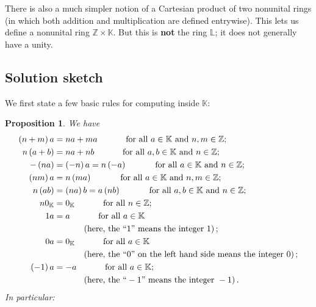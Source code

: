 \documentclass[paper=a4, fontsize=12pt]{scrartcl}%
\theoremstyle{plainsl}
\newtheorem{proposition}[theorem]{Proposition}
\theoremstyle{definition}
\theoremstyle{remark}
\begin{document}
There is also a much simpler notion of a Cartesian product of two nonunital
rings (in which both addition and multiplication are defined entrywise). This
lets us define a nonunital ring $\mathbb{Z} \times\mathbb{K}$. But this is
\textbf{not} the ring $\mathbb{L}$; it does not generally have a unity.

\subsection{Solution sketch}

We first state a few basic rules for computing inside $\mathbb{K}$:

\begin{proposition}
\label{prop.rings.Zscal.rules-nonunital}We have%
\begin{align}
\left(  n+m\right)  a  &  =na+ma\ \ \ \ \ \ \ \ \ \ \text{for all }%
a\in\mathbb{K}\text{ and }n,m\in\mathbb{Z}%
;\label{eq.prop.rings.Zscal.rules.(n+m)a}\\
n\left(  a+b\right)   &  =na+nb\ \ \ \ \ \ \ \ \ \ \text{for all }%
a,b\in\mathbb{K}\text{ and }n\in\mathbb{Z}%
;\label{eq.prop.rings.Zscal.rules.n(a+b)}\\
-\left(  na\right)   &  =\left(  -n\right)  a=n\left(  -a\right)
\ \ \ \ \ \ \ \ \ \ \text{for all }a\in\mathbb{K}\text{ and }n\in
\mathbb{Z};\label{eq.prop.rings.Zscal.rules.-na}\\
\left(  nm\right)  a  &  =n\left(  ma\right)  \ \ \ \ \ \ \ \ \ \ \text{for
all }a\in\mathbb{K}\text{ and }n,m\in\mathbb{Z}%
;\label{eq.prop.rings.Zscal.rules.nma}\\
n\left(  ab\right)   &  =\left(  na\right)  b=a\left(  nb\right)
\ \ \ \ \ \ \ \ \ \ \text{for all }a,b\in\mathbb{K}\text{ and }n\in
\mathbb{Z};\label{eq.prop.rings.Zscal.rules.nab}\\
n0_{\mathbb{K}}  &  =0_{\mathbb{K}}\ \ \ \ \ \ \ \ \ \ \text{for all }%
n\in\mathbb{Z};\label{eq.prop.rings.Zscal.rules.n0}\\
1a  &  =a\ \ \ \ \ \ \ \ \ \ \text{for all }a\in\mathbb{K}%
\label{eq.prop.rings.Zscal.rules.1a}\\
&  \ \ \ \ \ \ \ \ \ \ \left(  \text{here, the \textquotedblleft%
}1\text{\textquotedblright\ means the integer }1\right)  ;\nonumber\\
0a  &  =0_{\mathbb{K}}\ \ \ \ \ \ \ \ \ \ \text{for all }a\in\mathbb{K}%
\label{eq.prop.rings.Zscal.rules.0a}\\
&  \ \ \ \ \ \ \ \ \ \ \left(  \text{here, the \textquotedblleft%
}0\text{\textquotedblright\ on the left hand side means the integer }0\right)
;\nonumber\\
\left(  -1\right)  a  &  =-a\ \ \ \ \ \ \ \ \ \ \text{for all }a\in
\mathbb{K};\label{eq.prop.rings.Zscal.rules.-1a}\\
&  \ \ \ \ \ \ \ \ \ \ \left(  \text{here, the \textquotedblleft%
}-1\text{\textquotedblright\ means the integer }-1\right)  .\nonumber
\end{align}
In particular:


\end{proposition}
\end{document}
